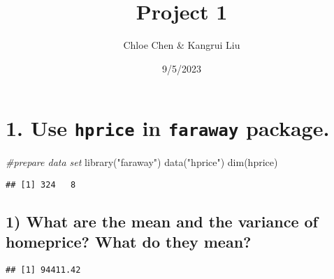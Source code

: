 \documentclass[
  12pt,
]{article}
\title{Project 1}
\author{Chloe Chen \& Kangrui Liu}
\date{9/5/2023}
\newenvironment{Shaded}{\begin{snugshade}}{\end{snugshade}}
\newcommand{\CommentTok}[1]{\textcolor[rgb]{0.56,0.35,0.01}{\textit{#1}}}
\newcommand{\DecValTok}[1]{\textcolor[rgb]{0.00,0.00,0.81}{#1}}
\newcommand{\FunctionTok}[1]{\textcolor[rgb]{0.00,0.00,0.00}{#1}}
\newcommand{\NormalTok}[1]{#1}
\newcommand{\OtherTok}[1]{\textcolor[rgb]{0.56,0.35,0.01}{#1}}
\newcommand{\SpecialCharTok}[1]{\textcolor[rgb]{0.00,0.00,0.00}{#1}}
\newcommand{\StringTok}[1]{\textcolor[rgb]{0.31,0.60,0.02}{#1}}
\begin{document}
\maketitle

\hypertarget{use-in-package.}{%
\section{\texorpdfstring{1. Use \texttt{hprice} in \texttt{faraway}
package.}{1. Use  in  package.}}\label{use-in-package.}}

\begin{Shaded}
\begin{Highlighting}[]
\CommentTok{\#prepare data set}
\FunctionTok{library}\NormalTok{(}\StringTok{"faraway"}\NormalTok{)}
\FunctionTok{data}\NormalTok{(}\StringTok{"hprice"}\NormalTok{)}
\FunctionTok{dim}\NormalTok{(hprice)}
\end{Highlighting}
\end{Shaded}

\begin{verbatim}
## [1] 324   8
\end{verbatim}

\begin{Shaded}
\end{Shaded}

\hypertarget{what-are-the-mean-and-the-variance-of-homeprice-what-do-they-mean}{%
\subsection{1) What are the mean and the variance of homeprice? What do
they
mean?}\label{what-are-the-mean-and-the-variance-of-homeprice-what-do-they-mean}}

\begin{Shaded}
\end{Shaded}

\begin{verbatim}
## [1] 94411.42
\end{verbatim}
\end{document}
